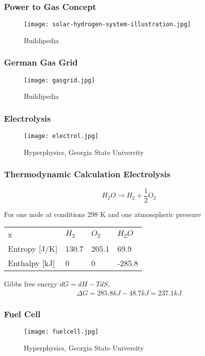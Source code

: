 \documentclass[10pt,aspectratio=169,dvipsnames]{beamer}
\begin{document}
\begin{frame}
 \frametitle{Power to Gas Concept}
   \begin{figure}
     \texttt{[image: solar-hydrogen-system-illustration.jpg]}
  \caption{Buildipedia}
  \end{figure}
\end{frame}
\begin{frame}
 \frametitle{German Gas Grid}
   \begin{figure}
     \texttt{[image: gasgrid.jpg]}
  \caption{Buildipedia}
  \end{figure}
\end{frame}
\begin{frame}
  \frametitle{Electrolysis}

  \begin{figure}
     \texttt{[image: electrol.jpg]}
  \caption{Hyperphysics, Georgia State University}
  \end{figure}


\end{frame}
\begin{frame}
 \frametitle{Thermodynamic Calculation Electrolysis}
  \begin{equation*}
  H_2 O \rightarrow H_2 + \frac{1}{2} O_2
 \end{equation*}

 For one mole at conditions 298 K and one atmosspheric pressure

 \begin{table}
  \begin{center}
\begin{tabular}{llll}
x & $H_2$ & $O_2$ & $H_2 O$\\
Entropy [J/K] & 130.7 & 205.1 & 69.9\\
Enthalpy [kJ] & 0 & 0 & -285.8
  \end{tabular}
  \end{center}

 \end{table}

 Gibbs free energy $dG = dH - TdS$,
 \begin{align*}
 \Delta G = 285.8 kJ - 48.7 kJ = 237.1 kJ
 \end{align*}

\end{frame}


\begin{frame}
  \frametitle{Fuel Cell}

  \begin{figure}
     \texttt{[image: fuelcell.jpg]}
  \caption{Hyperphysics, Georgia State University}
  \end{figure}




\end{frame}
\end{document}
